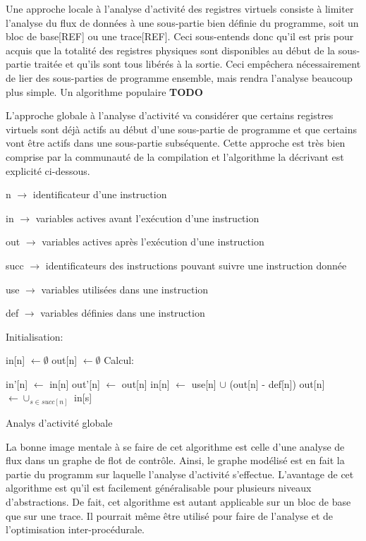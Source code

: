 \documentclass{article} %
\begin{document}
Une approche locale à l'analyse d'activité des registres virtuels consiste à limiter l'analyse du flux de données à une sous-partie bien définie du programme, soit un bloc de base[REF] ou une trace[REF]. Ceci sous-entends donc qu'il est pris pour acquis que la totalité des registres physiques sont disponibles au début de la sous-partie traitée et qu'ils sont tous libérés à la sortie. Ceci empêchera nécessairement de lier des sous-parties de programme ensemble, mais rendra l'analyse beaucoup plus simple. Un algorithme populaire \textbf{TODO}

L'approche globale à l'analyse d'activité va considérer que certains registres virtuels sont déjà actifs au début d'une sous-partie de programme et que certains vont être actifs dans une sous-partie subséquente. Cette approche est très bien comprise par la communauté de la compilation et l'algorithme la décrivant est explicité ci-dessous.

\begin{algorithm}[H]
 \KwData
 {
 	
 	n $\rightarrow$ identificateur d'une instruction
 
	in $\rightarrow$ variables actives avant l'exécution d'une instruction

 	out $\rightarrow$ variables actives après l'exécution d'une instruction
 	
 	succ $\rightarrow$ identificateurs des instructions pouvant suivre une instruction donnée
 	
 	use $\rightarrow$ variables utilisées dans une instruction
 	
 	def $\rightarrow$ variables définies dans une instruction
 }
 Initialisation:
 
 {
 	in[n] $\leftarrow \emptyset$\;
 	out[n] $\leftarrow \emptyset$\;
 }
 Calcul:
 
 {
  	{
  		in'[n] $\leftarrow$ in[n]\;
  		out'[n] $\leftarrow$ out[n]\;
  		in[n] $\leftarrow$ use[n] $\cup$ (out[n] - def[n])\;
  		out[n] $\leftarrow \cup_{s \in succ[n]}$ in[s]\;
  	}
 }
 \caption{Analys d'activité globale}
\end{algorithm}

La bonne image mentale à se faire de cet algorithme est celle d'une analyse de flux dans un graphe de flot de contrôle. Ainsi, le graphe modélisé est en fait la partie du programm sur laquelle l'analyse d'activité s'effectue. L'avantage de cet algorithme est qu'il est facilement généralisable pour plusieurs niveaux d'abstractions. De fait, cet algorithme est autant applicable sur un bloc de base que sur une trace. Il pourrait même être utilisé pour faire de l'analyse et de l'optimisation inter-procédurale.
\end{document}
